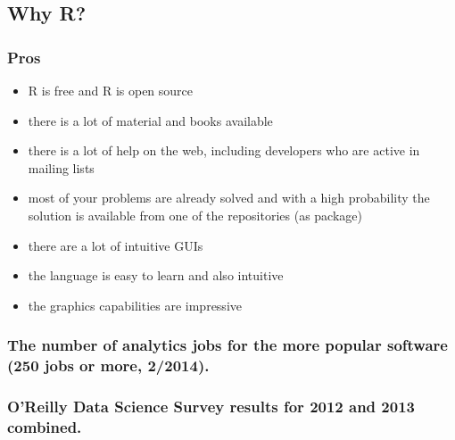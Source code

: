 \documentclass[xcolor={table},c]{beamer}
\begin{document}
\subsection{Why R?}
\begin{frame}\frametitle{Pros}
  \begin{itemize}
    \item R is free and R is open source
    \item there is a lot of material and books available
    \item there is a lot of help on the web, including developers who are active in mailing lists
    \item most of your problems are already solved and with a high probability the solution is available from one of the repositories (as package)
    \item there are a lot of intuitive GUIs
    \item the language is easy to learn and also intuitive
    \item the graphics capabilities are impressive
  \end{itemize}
\end{frame}


\begin{frame}\frametitle{The number of analytics jobs for the more popular software (250 jobs or more, 2/2014).}
  \begin{center}
  \end{center}
\end{frame}

\begin{frame}\frametitle{O’Reilly Data Science Survey results for 2012 and 2013 combined.}
  \begin{center}
  \end{center}
\end{frame}
\end{document}
